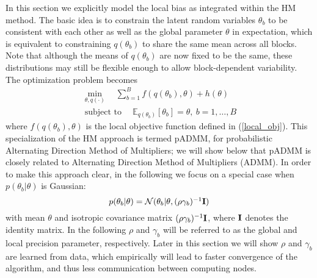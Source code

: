 \documentclass{article}
\DeclareMathOperator*{\st}{subject~to}
\newcommand{\Imat}[0]{\ensuremath{{\bf I}}\xspace}
\newcommand{\1}[0]{\ensuremath{\boldsymbol{1}}\xspace}
\begin{document}
In this section we explicitly model the local bias as integrated within the HM method. The basic idea is to constrain the latent random variables $\theta_b$ to be consistent with each other as well as the global parameter $\theta$ in expectation, which is equivalent to constraining $q(\theta_b)$ to share the same mean across all blocks. Note that although the means of $q(\theta_b)$ are now fixed to be the same, these distributions may still be flexible enough to allow block-dependent variability. The optimization problem becomes
\begin{equation}\label{padmm}
\begin{gathered}
\textstyle\min_{\theta, q(\cdot)} \quad\textstyle\sum_{b=1}^B f(q(\theta_b), \theta) + h(\theta)\\
\textstyle\st \quad \mathbb{E}_{q(\theta_b)}[\theta_b] = \theta, ~ b = 1, \ldots, B
\end{gathered}
\end{equation}
where $f(q(\theta_b), \theta)$ is the local objective function defined in (\ref{local_obj}). This specialization of the HM approach is termed pADMM, for probabilistic Alternating Direction Method of Multipliers; we will show below that pADMM is closely related to Alternating Direction Method of Multipliers (ADMM). In order to make this approach clear, in the following we focus on a special case when $p(\theta_b|\theta)$ is Gaussian:
\begin{equation}\label{gaussian_prior}
\textstyle p(\theta_b|\theta) = \mathcal{N}(\theta_b | \theta, (\rho\gamma_b)^{-1}\Imat)
\end{equation}
with mean $\theta$ and isotropic covariance matrix $(\rho\gamma_b)^{-1}\Imat$, where $\Imat$ denotes the identity matrix. In the following $\rho$ and $\gamma_b$ will be referred to as the global and local precision parameter, respectively. Later in this section we will show $\rho$ and $\gamma_b$ are learned from data, which empirically will lead to faster convergence of the algorithm, and thus less communication between computing nodes.
\end{document}
